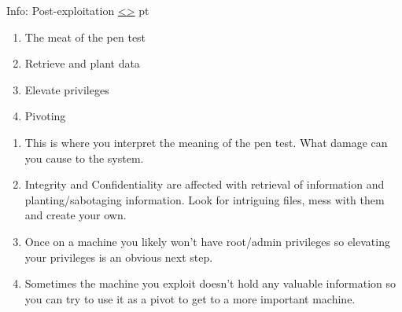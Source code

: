 \documentclass[12pt]{extarticle}
\newenvironment{instructionblock}{\Large\bgroup}{\egroup}
\newcounter{next}
\newcounter{prev}
\begin{document}
\pagebreak
{}
\begin{slide}{Info: Post-exploitation}
{\hyperref[slide \theprev]{\textless}\hyperref[slide \thenext]{\textgreater}}
	 pt
	\begin{instructionblock}
		\begin{enumerate}
            \item The meat of the pen test
            \item Retrieve and plant data
            \item Elevate privileges
            \item Pivoting
		\end{enumerate}
	\end{instructionblock}
\end{slide}
\begin{enumerate}
\item This is where you interpret the meaning of the pen test. What damage can you cause to the system. \cite[Chapter 0]{Ref:Weidman}
\item Integrity and Confidentiality are affected with retrieval of information and planting/sabotaging information. Look for intriguing files, mess with them and create your own. \cite[Chapter 13]{Ref:Weidman}
\item Once on a machine you likely won't have root/admin privileges so elevating your privileges is an obvious next step.\cite[Chapter 13]{Ref:Weidman}
\item Sometimes the machine you exploit doesn't hold any valuable information so you can try to use it as a pivot to get to a more important machine. \cite[Chapter 13]{Ref:Weidman}
\end{enumerate}
\end{document}
